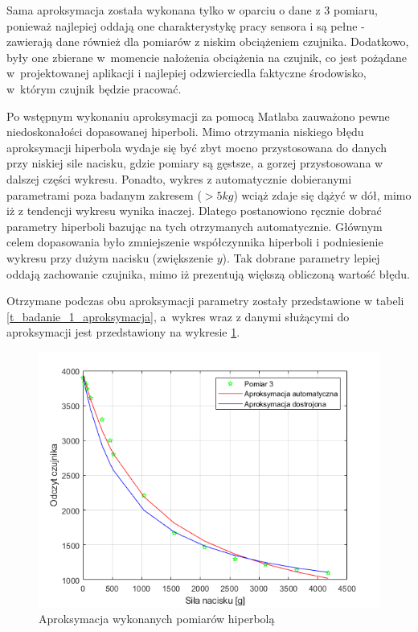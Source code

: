 Sama aproksymacja została wykonana tylko w oparciu o dane z 3 pomiaru, ponieważ najlepiej oddają one charakterystykę pracy sensora i są pełne - zawierają dane również dla pomiarów z niskim obciążeniem czujnika. Dodatkowo, były one zbierane w~momencie nałożenia obciążenia na czujnik, co jest pożądane w~projektowanej aplikacji i najlepiej odzwierciedla faktyczne środowisko, w~którym czujnik będzie pracować. 

Po wstępnym wykonaniu aproksymacji za pomocą Matlaba zauważono pewne niedoskonałości dopasowanej hiperboli. Mimo otrzymania niskiego błędu aproksymacji hiperbola wydaje się być zbyt mocno przystosowana do danych przy niskiej sile nacisku, gdzie pomiary są gęstsze, a gorzej przystosowana w dalszej części wykresu. Ponadto, wykres z automatycznie dobieranymi parametrami poza badanym zakresem ($>5 kg$) wciąż zdaje się dążyć w dół, mimo iż z tendencji wykresu wynika inaczej. Dlatego postanowiono ręcznie dobrać parametry hiperboli bazując na tych otrzymanych automatycznie. Głównym celem dopasowania było zmniejszenie współczynnika hiperboli i podniesienie wykresu przy dużym nacisku (zwiększenie $y$). Tak dobrane parametry lepiej oddają zachowanie czujnika, mimo iż prezentują większą obliczoną wartość błędu.

Otrzymane podczas obu aproksymacji parametry zostały przedstawione w tabeli \ref{t_badanie_1_aproksymacja}, a~wykres wraz z danymi służącymi do aproksymacji jest przedstawiony na wykresie \ref{f_badanie_1_aproksymacja}.

\begin{figure}[!h]
    \centering 
    \includegraphics[width=0.85\linewidth]{img/badanie_1_aproksymacja.png}
    \caption{Aproksymacja wykonanych pomiarów hiperbolą}
    \label{f_badanie_1_aproksymacja}
\end{figure}

